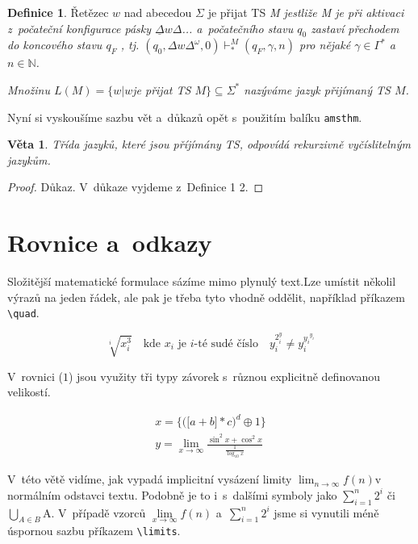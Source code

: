 \documentclass[11pt,a4paper,twocolumn]{article}
\theoremstyle{definition}
\newtheorem{definice}{Definice}
\theoremstyle{plain}
\newtheorem{veta}{Věta}
\begin{document}
\begin{definice}
Řetězec $w$ nad abecedou $\Sigma$ je přijat TS \textit{M jestliže M je při aktivaci z~počateční konfigurace pásky $\underline{\Delta}w\Delta$... a~počatečního stavu $q_0$ zastaví přechodem do koncového stavu $q_F$ , tj. $(q_0,\Delta w\Delta^\omega,0){{\vdash}^M_*} (q_F,\gamma,n)$ pro nějaké $\gamma\in\Gamma^*$ a~$n\in\mathbb{N}$.}

\textit{Množinu $L(M) = \{w|w$je přijat TS $M\}\subseteq\Sigma^*$ nazýváme jazyk přijímaný TS $M$.}
\vspace{2mm}

Nyní si vyskoušíme sazbu vět a~důkazů opět s~použitím balíku \verb|amsthm|.

\begin{veta}
\textit{Třída jazyků, které jsou příjímány TS, odpovídá rekurzivně vyčíslitelným jazykům.}
\end{veta}

\begin{proof}
Důkaz. V~důkaze vyjdeme z~Definice 1 2.
\end{proof}

\end{definice}

\section{Rovnice a~odkazy}
Složitější matematické formulace sázíme mimo plynulý text.Lze umístit několil výrazů na jeden řádek, ale pak je třeba tyto vhodně oddělit, například příkazem \verb|\quad|.

\begin{equation}
\nonumber
\sqrt[i]{x_i^3} \quad \text{kde } x_i \text{ je } i\text{-té sudé číslo} \quad y_i^{2^y_i} \neq y_i^{{y_i}^{y_i}} 
\end{equation}

V~rovnici ($1$) jsou využity tři typy závorek s~různou explicitně definovanou velikostí.

\setcounter{equation}{0}

\begin{eqnarray}\label{rovnice}
 x =\Bigg\{\bigg(\big[a+b]* c\bigg)^d\oplus 1\Bigg\}   \\
 y =\lim_{x\to\infty} \frac{\sin^2 
x+\cos^2 x}{\frac{1}{\log_{10}{x}}} \nonumber
\end{eqnarray}

V~této větě vidíme, jak vypadá implicitní vysázení limity $\lim_{n\to\infty} f(n)$v normálním odstavci textu. Podobně je to i~s~dalšími symboly jako $\sum_{i=1}^{n} 2^i$ či $\bigcup_{A\in B}$A. V~případě vzorců $\lim\limits_{x \to \infty}{f(n)}$ a~$\sum_{i=1}^{n} 2^i$ jsme si vynutili méně úspornou sazbu příkazem \verb|\limits|.
\end{document}
